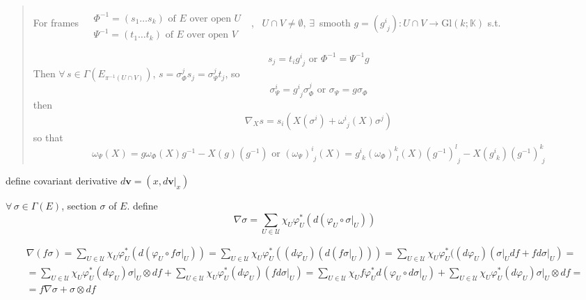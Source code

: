 \documentclass[10pt]{amsart}
\begin{document}
\begin{multicols*}{2}
\begin{quote}
For frames $\begin{aligned} & \quad \\
  & \Phi^{-1} = (s_1 \dots s_k) \text{ of $E$ over open $U$ } \\
  & \Psi^{-1} = (t_1 \dots t_k) \text{ of $E$ over open $V$ } 
\end{aligned}$, \, $U\cap V \neq \emptyset$, $\exists \, $ smooth $g = (g^i_{ \,\, j} ):U \cap V \to \text{Gl}(k;\mathbb{K})$ s.t. 

\[
s_j = t_i g^i_{ \,\, j} \text{ or } \Phi^{-1} = \Psi^{-1}g 
\]
Then $\forall \, s \in \Gamma(E_{\pi^{-1}(U\cap V) })$, $s = \sigma^j_{\Phi}s_j = \sigma^j_{\Psi} t_j$, so 
\[
\sigma^i_{\Psi} = g^i_{  \, \, j} \sigma^j_{\Phi} \text{ or } \sigma_{\Psi} = g\sigma_{\Phi}
\]
then
\[
\nabla_X s = s_i(X(\sigma^i) + \omega^i_{ \,\, j}(X)\sigma^j) 
\]
so that 
\begin{equation}
\boxed{ \omega_{\Psi}(X) = g\omega_{\Phi}(X)g^{-1} - X(g)(g^{-1}) \text{ or } (\omega_{\Psi})^i_{\, \, j}(X) = g^i_{ \,\, k} (\omega_{\Phi})^k_{ \,\, l }(X) (g^{-1})^l_{ \,\, j} - X(g^i_{ \,\, k})(g^{-1})^k_{ \,\, j} }
\end{equation}
\end{quote}




define covariant derivative $d\mathbf{v} = (x,\left. d\mathbf{v}\right|_x)$

$\forall \, \sigma \in \Gamma(E)$, section $\sigma$ of $E$. define
\[
\nabla \sigma = \sum_{U \in \mathcal{U}} \chi_U \varphi_U^*(d(\varphi_U \circ \left. \sigma \right|_U ) )
\]

\[
\begin{gathered}
  \nabla (f\sigma) = \sum_{U \in \mathcal{U}} \chi_U \varphi_U^*(d(\varphi_U \circ f \left. \sigma \right|_U ) )  = \sum_{U \in \mathcal{U}} \chi_U \varphi_U^*((d\varphi_U) (d (f \left. \sigma \right|_U ) ) ) = \sum_{U \in \mathcal{U}} \chi_U \varphi_U^*((d\varphi_U) ( \left. \sigma \right|_U df + f \left. d\sigma \right|_U ) = \\
=  \sum_{U \in \mathcal{U}} \chi_U \varphi_U^*(d\varphi_U) \left. \sigma \right|_U \otimes df + \sum_{U \in \mathcal{U}} \chi_U \varphi_U^*(d\varphi_U)(f \left. d\sigma  \right|_U ) = \sum_{U \in \mathcal{U}} \chi_U f \varphi_U^* d ( \varphi_U \circ \left. d\sigma  \right|_U ) +  \sum_{U \in \mathcal{U}} \chi_U \varphi_U^*(d\varphi_U) \left. \sigma \right|_U \otimes df = \\
= f\nabla \sigma + \sigma \otimes df
\end{gathered}
\]


\end{multicols*}
\end{document}

